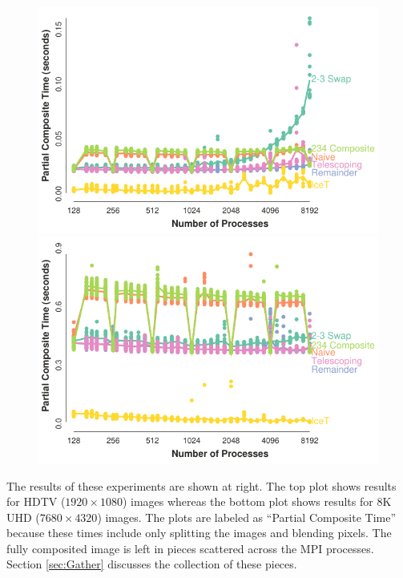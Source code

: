 \documentclass{vgtc}                          %
\newcommand{\textalgorithm}[1]{\textsf{#1}\xspace}
\newcommand{\binaryswap}{\textalgorithm{binary swap}}
\begin{document}
\begin{figure}
  \includegraphics[width=\linewidth]{scaling-hdtv}
  \includegraphics[width=\linewidth]{scaling-8k}
\end{figure}
The results of these experiments are shown at right.
The top plot shows results for HDTV ($1920 \times 1080$) images whereas the bottom plot shows results for 8K UHD ($7680 \times 4320$) images.
The plots are labeled as ``Partial Composite Time'' because these times include only splitting the images and blending pixels.
The fully composited image is left in pieces scattered across the MPI processes.
Section \ref{sec:Gather} discusses the collection of these pieces.
\end{document}
